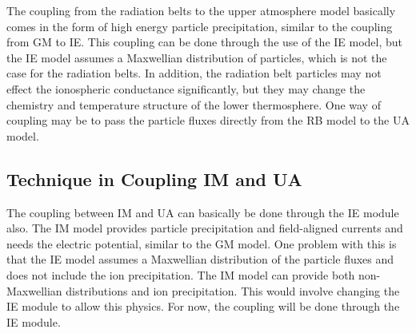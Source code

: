 \documentclass[twoside,10pt]{article}
\begin{document}
The coupling from the radiation belts to the upper atmosphere model
basically comes in the form of high energy particle precipitation,
similar to the coupling from GM to IE.  This coupling can be done
through the use of the IE model, but the IE model assumes a Maxwellian
distribution of particles, which is not the case for the radiation
belts.  In addition, the radiation belt particles may not effect the
ionospheric conductance significantly, but they may change the
chemistry and temperature structure of the lower thermosphere.  One
way of coupling may be to pass the particle fluxes directly from the
RB model to the UA model.

\subsection{Technique in Coupling IM and UA}

The coupling between IM and UA can basically be done through the IE
module also.  The IM model provides particle precipitation and
field-aligned currents and needs the electric potential, similar to
the GM model.  One problem with this is that the IE model assumes a
Maxwellian distribution of the particle fluxes and does not include
the ion precipitation.  The IM model can provide both non-Maxwellian
distributions and ion precipitation.  This would involve changing the
IE module to allow this physics.  For now, the coupling will be done
through the IE module.

\end{document}
